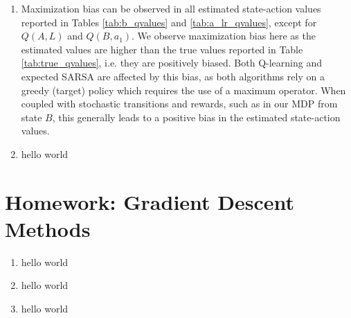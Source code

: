 \documentclass{article}
\begin{document}
\begin{enumerate}
\begin{table}[ht]
\begin{tabular}{@{}cccccc@{}}
		      \end{tabular}
	      \end{table}
	\item Maximization bias can be observed in all estimated state-action values reported in Tables
	      \ref{tab:b_qvalues} and \ref{tab:a_lr_qvalues}, except for $Q(A, L)$ and $Q(B, a_1)$. We
	      observe maximization bias here as the estimated values are higher than the true values
	      reported in Table \ref{tab:true_qvalues}, i.e. they are positively biased. Both Q-learning
	      and expected SARSA are affected by this bias, as both algorithms rely on a greedy (target)
	      policy which requires the use of a maximum operator. When coupled with stochastic
	      transitions and rewards, such as in our MDP from state $B$, this generally leads to
	      a positive bias in the estimated state-action values.
	\item hello world
\end{enumerate}

\section*{Homework: Gradient Descent Methods}
\begin{enumerate}
	\item hello world
	\item hello world
	\item hello world
\end{enumerate}
\end{document}
